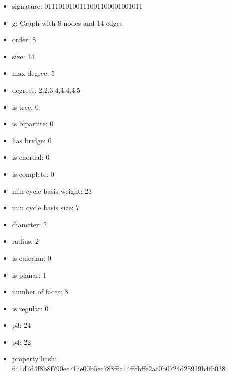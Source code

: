 \begin{itemize}
\item signature: 0111010100111001100001001011
\item g: Graph with 8 nodes and 14 edges
\item order: 8
\item size: 14
\item max degree: 5
\item degrees: 2,2,3,4,4,4,4,5
\item is tree: 0
\item is bipartite: 0
\item has bridge: 0
\item is chordal: 0
\item is complete: 0
\item min cycle basis weight: 23
\item min cycle basis size: 7
\item diameter: 2
\item radius: 2
\item is eulerian: 0
\item is planar: 1
\item number of faces: 8
\item is regular: 0
\item p3: 24
\item p4: 22
\item property hash: 641d7d4f8b8f790ec717e00b5ec788f6a14ffcbffe2ac0b0724d25919b4fb038
\end{itemize}
\newpage
\begin{figure}
\end{figure}
